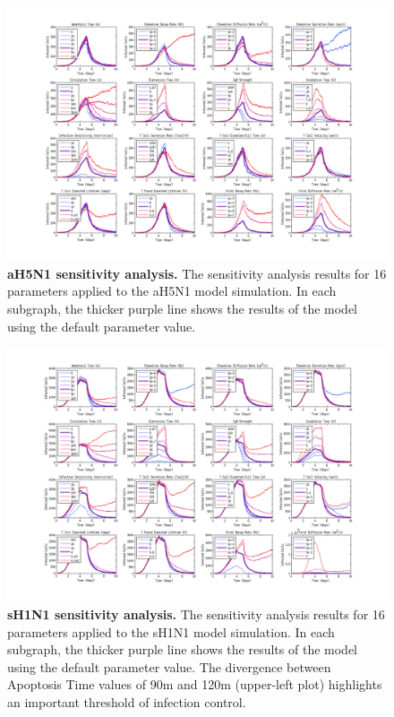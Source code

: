 \documentclass[preprint,10pt,authoryear]{elsarticle}
\begin{document}
\pagebreak
\begin{landscape}

\begin{figure}[ht!]
\begin{center}
	\includegraphics[width=9in]{Figure_S3}
	\caption{\textbf{aH5N1 sensitivity analysis.} The sensitivity analysis results for 16 parameters applied to the aH5N1 model simulation.  In each subgraph, the thicker purple line shows the results of the model using the default parameter value.}
	\label{fig:asensitivity}
\end{center}
\end{figure}

\begin{figure}[ht!]
\begin{center}
	\includegraphics[width=9in]{Figure_S4}
	\caption{\textbf{sH1N1 sensitivity analysis.} The sensitivity analysis results for 16 parameters applied to the sH1N1 model simulation.  In each subgraph, the thicker purple line shows the results of the model using the default parameter value.  The divergence between Apoptosis Time values of 90m and 120m (upper-left plot) highlights an important threshold of infection control.}
	\label{fig:ssensitivity}
\end{center}
\end{figure}


\end{landscape}
\end{document}
